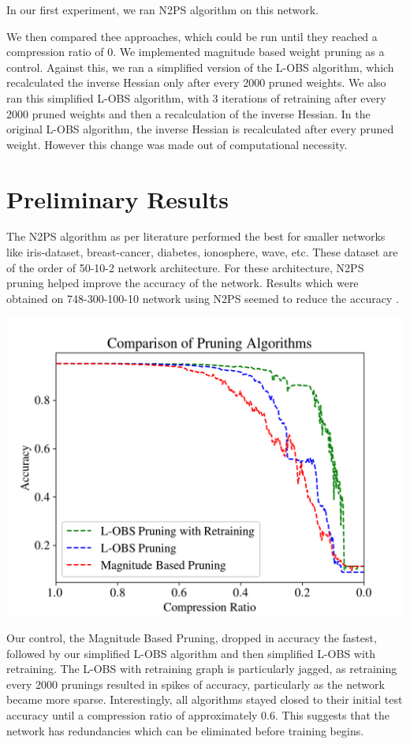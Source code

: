 \documentclass{article}
\begin{document}
In our first experiment, we ran N2PS algorithm on this network.

We then compared thee approaches, which could be run until they reached a compression ratio of 0. We implemented magnitude based weight pruning as a control. Against this, we ran a simplified version of the L-OBS algorithm, which recalculated the inverse Hessian only after every 2000 pruned weights. We also ran this simplified L-OBS algorithm, with 3 iterations of retraining after every 2000 pruned weights and then a recalculation of the inverse Hessian. In the original L-OBS algorithm, the inverse Hessian is recalculated after every pruned weight. However this change was made out of computational necessity.

\section{Preliminary Results}
\label{Preliminary Results}

The N2PS algorithm as per literature performed the best for smaller networks like iris-dataset, breast-cancer, diabetes, ionosphere, wave, etc. These dataset are of the order of 50-10-2 network architecture. For these architecture, N2PS pruning helped improve the accuracy of the network. Results which were obtained on 748-300-100-10 network using N2PS seemed to reduce the accuracy .

\includegraphics[scale=0.55]{Comparison}

Our control, the Magnitude Based Pruning, dropped in accuracy the fastest, followed by our simplified L-OBS algorithm and then simplified L-OBS with retraining. The L-OBS with retraining graph is particularly jagged, as retraining every 2000 prunings resulted in spikes of accuracy, particularly as the network became more sparse. Interestingly, all algorithms stayed closed to their initial test accuracy until a compression ratio of approximately 0.6. This suggests that the network has redundancies which can be eliminated before training begins.
\end{document}
